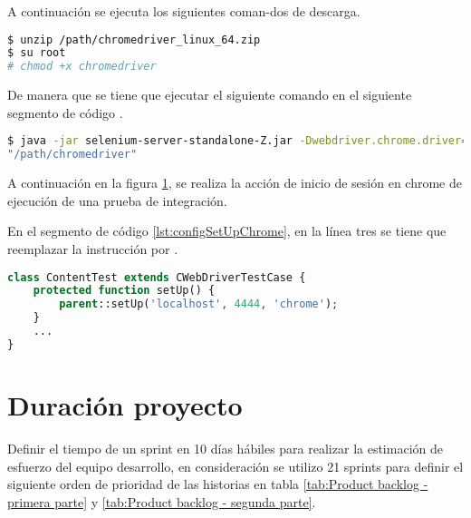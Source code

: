 \begin{itemize}
\begin{enumerate}
A continuación se ejecuta los siguientes coman-dos de descarga.

\begin{lstlisting}[language=bash, caption={Instalación de programa de control para chrome.}]
$ unzip /path/chromedriver_linux_64.zip
$ su root
# chmod +x chromedriver
\end{lstlisting}

De manera que se tiene que ejecutar el siguiente comando en el siguiente
segmento de código .

\begin{lstlisting}[language=bash, caption={Configuración chromedriver en selenium server.}]
$ java -jar selenium-server-standalone-Z.jar -Dwebdriver.chrome.driver=
"/path/chromedriver"
\end{lstlisting}

A continuación en la figura \ref{fig:Registro de sesión en navegador chrome},
se realiza la acción de inicio de sesión en chrome de ejecución de una prueba
de integración.

\begin{figure}[!ht]
	\centering
	\label{fig:Registro de sesión en navegador chrome}
\end{figure}

En el segmento de código \ref{lst:configSetUpChrome}, en la línea tres se
tiene que reemplazar la instrucción  por .

\begin{lstlisting}[language=PHP, caption={Configuración de ejecución de prueba para chrome.}, label={lst:configSetUpChrome}]
class ContentTest extends CWebDriverTestCase {
	protected function setUp() {
        parent::setUp('localhost', 4444, 'chrome');
    }
    ...
}
\end{lstlisting}

\end{enumerate}

\end{itemize}

\section{Duración proyecto}

Definir el tiempo de un sprint en 10 días hábiles para realizar la estimación
de esfuerzo del equipo desarrollo, en consideración se utilizo 21 sprints
para definir el siguiente orden de prioridad de las historias en tabla
\ref{tab:Product backlog - primera parte} y 
\ref{tab:Product backlog - segunda parte}.

